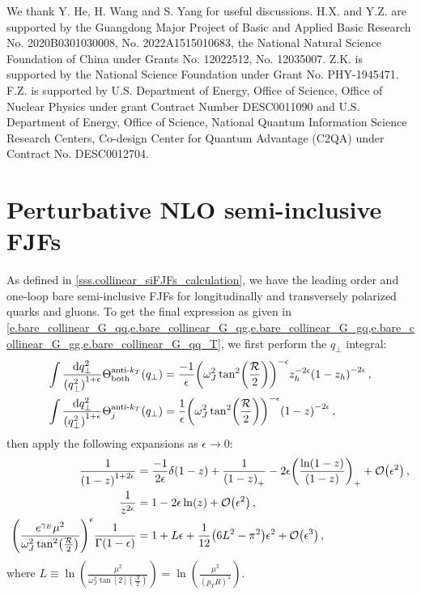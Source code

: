 \documentclass[a4paper, 11 pt]{article}
\begin{document}
\acknowledgments

We thank Y. He, H. Wang and S. Yang for useful discussions.
H.X. and Y.Z. are supported by the Guangdong Major Project of Basic and Applied Basic Research No. 2020B0301030008, No. 2022A1515010683, the National Natural Science Foundation of China under Grants No. 12022512, No. 12035007.
Z.K. is supported by the National Science Foundation under Grant No. PHY-1945471.
F.Z. is supported by U.S. Department of Energy, Office of Science, Office of Nuclear Physics under grant Contract Number DESC0011090 and U.S. Department of Energy, Office of Science, National Quantum Information Science Research Centers, Co-design Center for Quantum Advantage (C2QA) under Contract No. DESC0012704.


\appendix

\section{Perturbative NLO semi-inclusive FJFs}
\label{appendix.siFJFs}

As defined in \cref{sss.collinear_siFJFs_calculation}, we have the leading order and one-loop bare semi-inclusive FJFs for longitudinally and transversely polarized quarks and gluons.
To get the final expression as given in \cref{e.bare_collinear_G_qq,e.bare_collinear_G_qg,e.bare_collinear_G_gq,e.bare_collinear_G_gg,e.bare_collinear_G_qq_T}, we first perform the $q_{\perp}$ integral:
\begin{align}
\int \frac{\dd{q_{\perp}^2}}{\pqty{q_{\perp}^2}^{1 + \epsilon}}
\Theta^{\text{anti-}k_T}_{\textrm{both}} \pqty{q_{\perp}}
& =
\frac{-1}{\epsilon} \pqty{\omega _J^2 \tan[2](\frac{\mathcal{R}}{2})}^{- \epsilon}
z_h^{-2 \epsilon} \pqty{1 - z_h}^{-2 \epsilon} \, , \\
\int \frac{\dd{q_{\perp}^2}}{\pqty{q_{\perp}^2}^{1 + \epsilon}}
\Theta^{\text{anti-}k_T}_{j} \pqty{q_{\perp}}
& =
\frac{1}{\epsilon} \pqty{\omega _J^2 \tan[2](\frac{\mathcal{R}}{2})}^{- \epsilon}
\pqty{1 - z}^{-2 \epsilon}
\, , 
\end{align}
then apply the following expansions as $\epsilon \to 0$:
\begin{align}
\frac{1}{\pqty{1 - z}^{1 + 2 \epsilon}}
& =
\frac{-1}{2 \epsilon} \delta \pqty{1 - z} + \frac{1}{\pqty{1 - z}_+} - 2 \epsilon \pqty{\frac{\ln(1 - z)}{\pqty{1 - z}}}_+ + \order{\epsilon ^2}
\, , \\
\frac{1}{z^{2 \epsilon}}
& =
1 - 2 \epsilon \ln(z) + \order{\epsilon ^2}
\, , \\
\pqty{\frac{e^{\gamma _E} \mu ^2}{\omega _J^2 \tan[2](\frac{\mathcal{R}}{2})}}^{\epsilon}
\frac{1}{\Gamma \pqty{1 - \epsilon}}
& =
1 + L \epsilon + \frac{1}{12} \pqty{6 L^2 - \pi ^2} \epsilon ^2 + \order{\epsilon ^3}
\, , 
\end{align}
where $\displaystyle L \equiv \ln(\frac{\mu ^2}{\omega _J^2 \tan[2](\frac{\mathcal{R}}{2})}) = \ln(\frac{\mu ^2}{(p_TR)^2})$.
 
\end{document}
